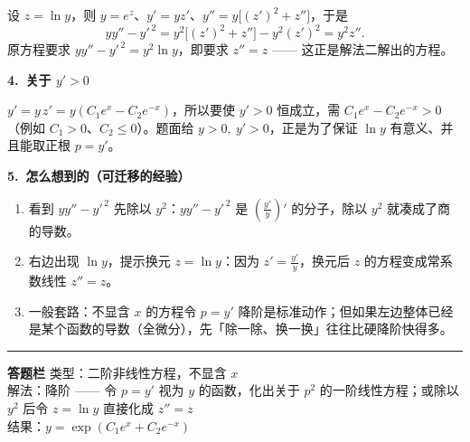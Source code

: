 \documentclass[11pt,a4paper]{ctexart}
\begin{document}
设 $z=\ln y$，则 $y=e^{z}$、$y'=yz'$、$y''=y\bigl[(z')^{2}+z''\bigr]$，于是
\[
yy''-y'^{\,2}=y^{2}\bigl[(z')^{2}+z''\bigr]-y^{2}(z')^{2}=y^{2}z'' .
\]
原方程要求 $yy''-y'^{\,2}=y^{2}\ln y$，即要求 $z''=z$ —— 这正是解法二解出的方程。

\textbf{4.\ 关于 $y'>0$}

$y'=y\,z'=y\left(C_1e^{x}-C_2e^{-x}\right)$，所以要使 $y'>0$ 恒成立，需 $C_1e^{x}-C_2e^{-x}>0$（例如 $C_1>0$、$C_2\le 0$）。题面给 $y>0,\ y'>0$，正是为了保证 $\ln y$ 有意义、并且能取正根 $p=y'$。


\textbf{5.\ 怎么想到的（可迁移的经验）}

\begin{enumerate}
\item 看到 $yy''-y'^{\,2}$ 先除以 $y^{2}$：$yy''-y'^{\,2}$ 是 $\left(\frac{y'}{y}\right)'$ 的分子，除以 $y^{2}$ 就凑成了商的导数。
\item 右边出现 $\ln y$，提示换元 $z=\ln y$：因为 $z'=\frac{y'}{y}$，换元后 $z$ 的方程变成常系数线性 $z''=z$。
\item 一般套路：不显含 $x$ 的方程令 $p=y'$ 降阶是标准动作；但如果左边整体已经是某个函数的导数（全微分），先「除一除、换一换」往往比硬降阶快得多。
\end{enumerate}

\vspace{0.2em}
\noindent\rule{\linewidth}{0.6pt}

{\small
\textbf{答题栏}\quad
类型：二阶非线性方程，不显含 $x$\\
解法：降阶 —— 令 $p=y'$ 视为 $y$ 的函数，化出关于 $p^{2}$ 的一阶线性方程；或除以 $y^{2}$ 后令 $z=\ln y$ 直接化成 $z''=z$\\
结果：$y=\exp\left(C_1e^{x}+C_2e^{-x}\right)$}
\end{document}
